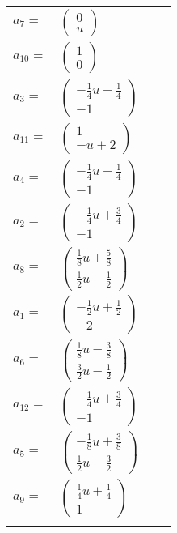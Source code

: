 \documentclass[1p]{elsarticle_modified}
\theoremstyle{definition}
\begin{document}
\begin{tabular}{m{7pt} m{180pt} m{7pt} m{180pt} }
\flushright $a_{7}=$&$\begin{pmatrix}0\\u\end{pmatrix}$ \\
\flushright $a_{10}=$&$\begin{pmatrix}1\\0\end{pmatrix}$ \\
\flushright $a_{3}=$&$\begin{pmatrix}-\frac{1}{4} u-\frac{1}{4}\\-1\end{pmatrix}$ \\
\flushright $a_{11}=$&$\begin{pmatrix}1\\- u+2\end{pmatrix}$ \\
\flushright $a_{4}=$&$\begin{pmatrix}-\frac{1}{4} u-\frac{1}{4}\\-1\end{pmatrix}$ \\
\flushright $a_{2}=$&$\begin{pmatrix}-\frac{1}{4} u+\frac{3}{4}\\-1\end{pmatrix}$ \\
\flushright $a_{8}=$&$\begin{pmatrix}\frac{1}{8} u+\frac{5}{8}\\\frac{1}{2} u-\frac{1}{2}\end{pmatrix}$ \\
\flushright $a_{1}=$&$\begin{pmatrix}-\frac{1}{2} u+\frac{1}{2}\\-2\end{pmatrix}$ \\
\flushright $a_{6}=$&$\begin{pmatrix}\frac{1}{8} u-\frac{3}{8}\\\frac{3}{2} u-\frac{1}{2}\end{pmatrix}$ \\
\flushright $a_{12}=$&$\begin{pmatrix}-\frac{1}{4} u+\frac{3}{4}\\-1\end{pmatrix}$ \\
\flushright $a_{5}=$&$\begin{pmatrix}-\frac{1}{8} u+\frac{3}{8}\\\frac{1}{2} u-\frac{3}{2}\end{pmatrix}$ \\
\flushright $a_{9}=$&$\begin{pmatrix}\frac{1}{4} u+\frac{1}{4}\\1\end{pmatrix}$\\&\end{tabular}
\end{document}
